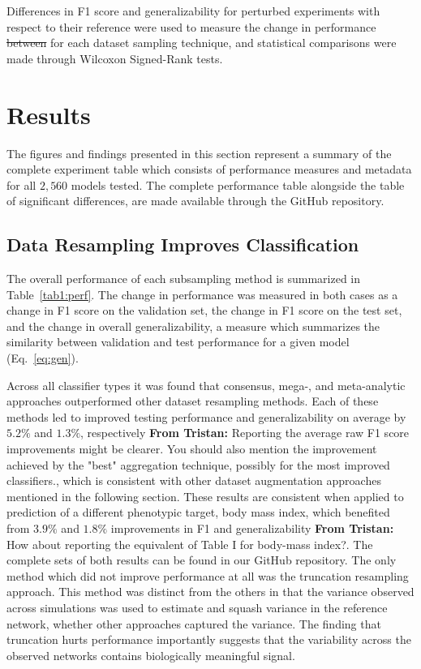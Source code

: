 \documentclass[10pt]{SelfArx} %
\newcommand{\tristan}[1]{\colorlet{saved}{.}\color{orange}\textbf{From Tristan:} #1\color{saved}\xspace}
\newcommand{\tristanmod}[2]{\colorlet{saved}{.}\color{orange}\sout{#1} #2\color{black}\xspace\color{saved}}
\newcommand{\new}[1]{\color{blue}#1\color{black}\xspace}
\begin{document}
Differences in F1 score and generalizability for perturbed experiments with respect to their reference were used to
measure the change in performance \tristanmod{between}{} for each dataset sampling technique, and statistical comparisons were made
through Wilcoxon Signed-Rank tests.


\section*{Results}

The figures and findings presented in this section represent a summary of the complete experiment table which consists
of performance measures and metadata for all $2,560$ models tested. The complete performance table alongside the table
of significant differences, are made available through the GitHub repository.

\subsection*{Data Resampling Improves Classification}

The overall performance of each subsampling method is summarized in Table~\ref{tab1:perf}. The change in performance
was measured in both cases as a change in F1 score on the validation set, the change in F1 score on the test set, and
the change in overall generalizability, a measure which summarizes the similarity between validation and test
performance for a given model \tristanmod{}{(Eq.~\ref{eq:gen})}.

Across all classifier types it was found that consensus, mega-, and meta-analytic approaches outperformed other dataset
resampling methods. Each of these methods led to improved testing performance and generalizability \new{on average
by $5.2\%$ and $1.3\%$, respectively \tristan{Reporting the average raw F1 score improvements might be clearer.
You should also mention the improvement achieved by the "best" aggregation technique, possibly for the most improved classifiers.}, which is consistent with other dataset augmentation approaches mentioned in the
following section. These results are consistent when applied to prediction of a different phenotypic target, body mass
index, which benefited from $3.9\%$ and $1.8\%$ improvements in F1 and generalizability \tristan{How about reporting the equivalent of Table I for body-mass index?}. The complete sets of both
results can be found in our GitHub repository}. The only method which did not improve performance at all was the
truncation resampling approach. This method was distinct from the others in that the variance observed across
simulations was used to estimate and squash variance in the reference network, whether other approaches captured the
variance. The finding that truncation hurts performance importantly suggests that the variability across the observed
networks contains biologically meaningful signal.
\end{document}
